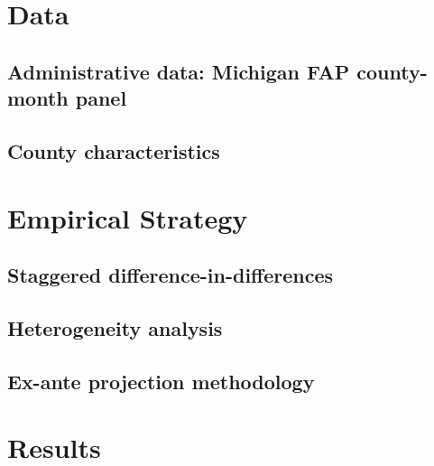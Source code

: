 \documentclass[11pt,a4paper]{article}
\begin{document}
\section{Data}
\label{sec:data}

\subsection{Administrative data: Michigan FAP county-month panel}

\subsection{County characteristics}

\section{Empirical Strategy}
\label{sec:methods}

\subsection{Staggered difference-in-differences}

\subsection{Heterogeneity analysis}

\subsection{Ex-ante projection methodology}

\section{Results}
\label{sec:results}
\end{document}
